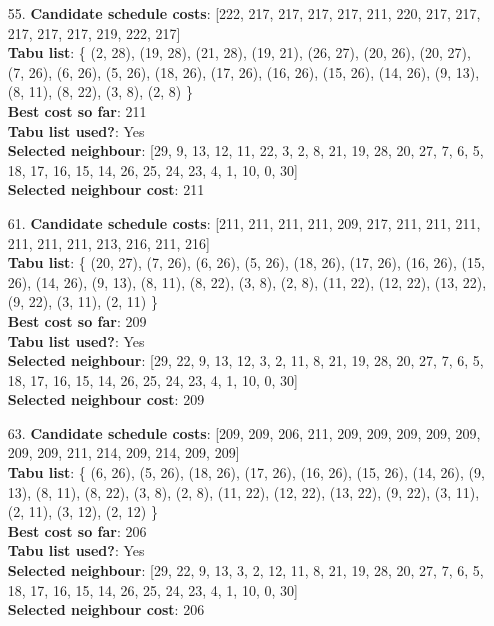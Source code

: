 \documentclass[fleqn]{article}
\begin{document}
\begin{itemize}
    \item[55.] \textbf{Candidate schedule costs}: [222, 217, 217, 217, 217, 211, 220, 217, 217, 217, 217, 217, 219, 222, 217] \\
    \textbf{Tabu list}: \{ (2, 28), (19, 28), (21, 28), (19, 21), (26, 27), (20, 26), (20, 27), (7, 26), (6, 26), (5, 26), (18, 26), (17, 26), (16, 26), (15, 26), (14, 26), (9, 13), (8, 11), (8, 22), (3, 8), (2, 8) \} \\
    \textbf{Best cost so far}: 211 \\
    \textbf{Tabu list used?}: Yes \\
    \textbf{Selected neighbour}: [29, 9, 13, 12, 11, 22, 3, 2, 8, 21, 19, 28, 20, 27, 7, 6, 5, 18, 17, 16, 15, 14, 26, 25, 24, 23, 4, 1, 10, 0, 30] \\
    \textbf{Selected neighbour cost}: 211
      

    \item[61.] \textbf{Candidate schedule costs}: [211, 211, 211, 211, 209, 217, 211, 211, 211, 211, 211, 211, 213, 216, 211, 216] \\
    \textbf{Tabu list}: \{ (20, 27), (7, 26), (6, 26), (5, 26), (18, 26), (17, 26), (16, 26), (15, 26), (14, 26), (9, 13), (8, 11), (8, 22), (3, 8), (2, 8), (11, 22), (12, 22), (13, 22), (9, 22), (3, 11), (2, 11) \} \\
    \textbf{Best cost so far}: 209 \\
    \textbf{Tabu list used?}: Yes \\
    \textbf{Selected neighbour}: [29, 22, 9, 13, 12, 3, 2, 11, 8, 21, 19, 28, 20, 27, 7, 6, 5, 18, 17, 16, 15, 14, 26, 25, 24, 23, 4, 1, 10, 0, 30] \\
    \textbf{Selected neighbour cost}: 209
      

    \item[63.] \textbf{Candidate schedule costs}: [209, 209, 206, 211, 209, 209, 209, 209, 209, 209, 209, 211, 214, 209, 214, 209, 209] \\
    \textbf{Tabu list}: \{ (6, 26), (5, 26), (18, 26), (17, 26), (16, 26), (15, 26), (14, 26), (9, 13), (8, 11), (8, 22), (3, 8), (2, 8), (11, 22), (12, 22), (13, 22), (9, 22), (3, 11), (2, 11), (3, 12), (2, 12) \} \\
    \textbf{Best cost so far}: 206 \\
    \textbf{Tabu list used?}: Yes \\
    \textbf{Selected neighbour}: [29, 22, 9, 13, 3, 2, 12, 11, 8, 21, 19, 28, 20, 27, 7, 6, 5, 18, 17, 16, 15, 14, 26, 25, 24, 23, 4, 1, 10, 0, 30] \\
    \textbf{Selected neighbour cost}: 206
      


\end{itemize}
\end{document}
